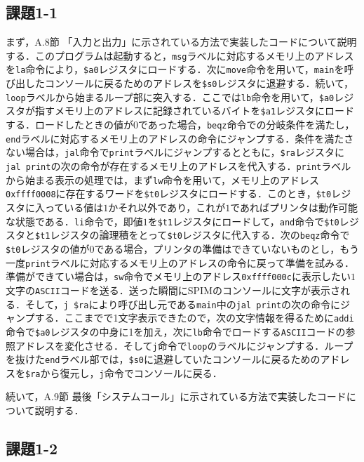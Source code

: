 \subsection{課題1-1}
まず，A.8節 「入力と出力」に示されている方法で実装したコードについて説明する．このプログラムは起動すると，\verb|msg|ラベルに対応するメモリ上のアドレスを\verb|la|命令により，\verb|$a0|レジスタにロードする．次に\verb|move|命令を用いて，\verb|main|を呼び出したコンソールに戻るためのアドレスを\verb|$s0|レジスタに退避する．続いて，\verb|loop|ラベルから始まるループ部に突入する．ここでは\verb|lb|命令を用いて，\verb|$a0|レジスタが指すメモリ上のアドレスに記録されているバイトを\verb|$a1|レジスタにロードする．ロードしたときの値が$0$であった場合，\verb|beqz|命令での分岐条件を満たし，\verb|end|ラベルに対応するメモリ上のアドレスの命令にジャンプする．条件を満たさない場合は，\verb|jal|命令で\verb|print|ラベルにジャンプするとともに，\verb|$ra|レジスタに\verb|jal print|の次の命令が存在するメモリ上のアドレスを代入する．\verb|print|ラベルから始まる表示の処理では，まず\verb|lw|命令を用いて，メモリ上のアドレス\verb|0xffff0008|に存在するワードを\verb|$t0|レジスタにロードする．このとき，\verb|$t0|レジスタに入っている値は$1$かそれ以外であり，これが$1$であればプリンタは動作可能な状態である．\verb|li|命令で，即値$1$を\verb|$t1|レジスタにロードして，\verb|and|命令で\verb|$t0|レジスタと\verb|$t1|レジスタの論理積をとって\verb|$t0|レジスタに代入する．次の\verb|beqz|命令で\verb|$t0|レジスタの値が$0$である場合，プリンタの準備はできていないものとし，もう一度\verb|print|ラベルに対応するメモリ上のアドレスの命令に戻って準備を試みる．準備ができてい場合は，\verb|sw|命令でメモリ上のアドレス\verb|0xffff000c|に表示したい$1$文字の\verb|ASCII|コードを送る．送った瞬間にSPIMのコンソールに文字が表示される．そして，\verb|j $ra|により呼び出し元である\verb|main|中の\verb|jal print|の次の命令にジャンプする．ここまでで1文字表示できたので，次の文字情報を得るために\verb|addi|命令で\verb|$a0|レジスタの中身に1を加え，次に\verb|lb|命令でロードする\verb|ASCII|コードの参照アドレスを変化させる．そして\verb|j|命令で\verb|loop|のラベルにジャンプする．ループを抜けた\verb|end|ラベル部では，\verb|$s0|に退避していたコンソールに戻るためのアドレスを\verb|$ra|から復元し，\verb|j|命令でコンソールに戻る．

続いて，A.9節 最後「システムコール」に示されている方法で実装したコードについて説明する．




\subsection{課題1-2}


